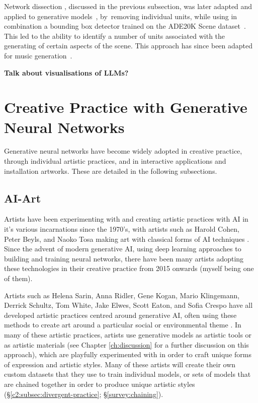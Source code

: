 Network dissection \citep{Bau2018-td}, discussed in the previous subsection, was later adapted and applied to generative models~\citep{Bau2018-td}, by~removing individual units, while using in combination a bounding box detector trained on the ADE20K Scene dataset~\citep{zhou2017scene}. 
This led to the ability to identify a number of units associated with the generating of certain aspects of the scene. 
This approach has since been adapted for music generation~\citep{Brink2019-gc}. 

\textbf{Talk about visualisations of LLMs?}

\section{Creative Practice with Generative Neural Networks}

Generative neural networks have become widely adopted in creative practice, through individual artistic practices, and in interactive applications and installation artworks. 
These are detailed in the following subsections.

\subsection{AI-Art} 

Artists have been experimenting with and creating artistic practices with AI in it's various incarnations since the 1970's, with artists such as Harold Cohen, Peter Beyls, and Naoko Tosa making art with classical forms of AI techniques \citep{grba2022deep}. 
Since the advent of modern generative AI, using deep learning approaches to building and training neural networks, there have been many artists adopting these technologies in their creative practice from 2015 onwards (myself being one of them). 

Artists such as Helena Sarin, Anna Ridler, Gene Kogan, Mario Klingemann, Derrick Schultz, Tom White, Jake Elwes, Scott Eaton, and Sofia Crespo have all developed artistic practices centred around generative AI, often using these methods to create art around a particular social or environmental theme \citep{grba2022deep}. 
In many of these artistic practices, artists use generative models as artistic tools or as artistic materials (see Chapter \ref{ch:discussion} for a further discussion on this approach), which are playfully experimented with in order to craft unique forms of expression and artistic styles.
Many of these artists will create their own custom datasets that they use to train individual models, or sets of models that are chained together in order to produce unique artistic styles (\S \ref{c2:subsec:divergent-practice}; \S \ref{survey:chaining}).

